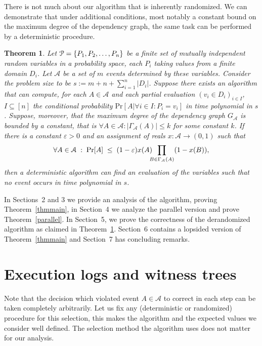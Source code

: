 \documentclass[11pt,a4paper]{article}
\newtheorem{theorem}{Theorem}[section]
\DeclareMathOperator*{\pr}{Pr}
\begin{document}
There is not much about our algorithm that is inherently randomized. We can demonstrate
that under additional conditions, most notably a constant bound on the maximum degree of
the dependency graph, the same task can be performed by a deterministic procedure.

\begin{theorem}
\label{deterministic}
Let $\mathcal P = \{P_1, P_2, \mathellipsis, P_n\}$ be a finite set of
mutually independent random variables in a probability space, each
$P_i$ taking values from a finite domain $D_i$. Let
$\mathcal{A}$
be a set of $m$ events determined by these variables. Consider the
problem size to be $s := m+n+\sum_{i =1}^n |D_i|$. Suppose there
exists an algorithm that can compute, for each $A \in \mathcal{A}$ and
each partial evaluation $(v_i \in D_i)_{i \in I}$, $I \subseteq [n]$
the conditional probability $\mbox{Pr}[A | \forall i \in I : P_i=v_i]$
in time polynomial in $s$. Suppose, moreover, that the maximum degree of the dependency graph
$G_{\mathcal{A}}$ is bounded by a constant,
that is $\forall A \in \mathcal{A} : |\Gamma_{\mathcal{A}}(A)| \le k$ for some
constant $k$. If there is a constant $\varepsilon > 0$ and
an assignment of reals $x : \mathcal{A} \rightarrow (0,1)$ such that 
$$ \forall A \in \mathcal{A} \; : \; \pr[A] \; \le \; (1-\varepsilon) x(A)
\hspace*{-0.2cm} \prod_{B \in \Gamma_{\mathcal A}(A)} (1 - x(B)),$$
then a deterministic algorithm can find an evaluation of the variables
such that no event occurs in time polynomial in $s$.
\end{theorem}

In Sections~2 and 3 we provide an analysis of the algorithm, proving
Theorem~\ref{thmmain}, in Section~4 we analyze the parallel version and prove
Theorem~\ref{parallel}. In Section~5,
we prove the correctness of the derandomized algorithm as claimed in
Theorem~\ref{deterministic}. Section~6 contains a lopsided version of
Theorem~\ref{thmmain} and Section~7 has concluding remarks. 

\section{Execution logs and witness trees}
\label{secalgo}

Note that the decision which violated event $A \in \mathcal{A}$ to correct
in each step can be taken completely arbitrarily. Let us fix any
(deterministic or randomized) procedure for this selection, this makes the
algorithm and the expected values we consider well defined.
The selection method the algorithm uses does not matter for our
analysis.
\end{document}
